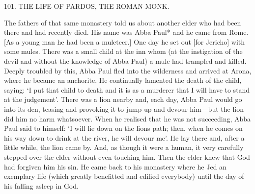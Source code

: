 101. THE LIFE OF PARDOS, THE ROMAN MONK.

The fathers of that same monastery told us about another elder who
had been there and had recently died. His name was Abba Paul*
and he came from Rome. [As a young man he had been a muleteer.]
One day he set out [for Jericho] with some mules. There was a small
child at the inn whom (at the instigation of the devil and without
the knowledge of Abba Paul) a mule had trampled and killed.
Deeply troubled by this, Abba Paul fled into the wilderness and
arrived at Arona, where he became an anchorite. He continually
lamented the death of the child, saying: `I put that child to death and it is as a murderer that I will have to stand at the judgement'.
There was a lion nearby and, each day, Abba Paul would go into
its den, teasing and provoking it to jump up and devour him—but
the lion did him no harm whatsoever. When he realised that he was
not succeeding, Abba Paul said to himself: `I will lie down on the
lion\textquotesingle s path; then, when he comes on his way down to drink at the
river, he will devour me'. He lay there and, after a little while, the
lion came by. And, as though it were a human, it very carefully
stepped over the elder without even touching him. Then the elder
knew that God had forgiven him his sin. He came back to his
monastery where he Jed an exemplary life (which greatly benefitted
and edified everybody) until the day of his falling asleep in God.

